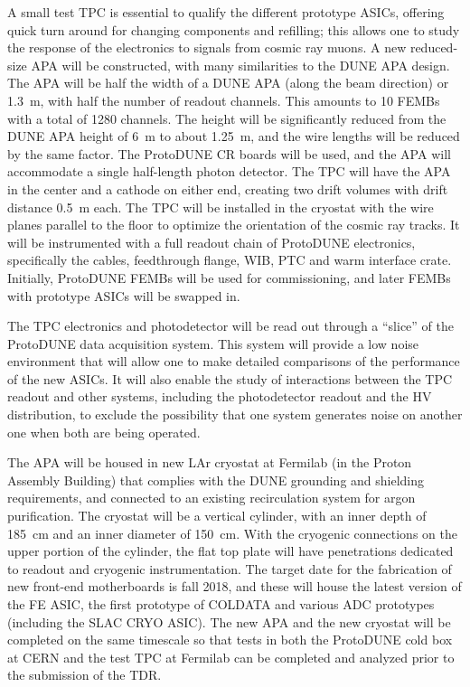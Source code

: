 A small test TPC is essential to qualify the different prototype ASICs, offering quick turn around for changing components and refilling; this allows one to study the response of the electronics to signals from cosmic ray muons.  A new reduced-size APA will be constructed, with many similarities to the DUNE APA design.  The APA will be half the width of a DUNE APA (along the beam direction) or 1.3~m, with half the number of readout channels.  This amounts to 10 FEMBs with a total of 1280 channels.  The height will be significantly reduced from the DUNE APA height of 6~m to about 1.25~m, and the wire lengths will be reduced by the same factor.  The ProtoDUNE CR boards will be used, and  the APA will accommodate a single half-length photon detector.  The TPC will have the APA in the center and a cathode on either end, creating two drift volumes with drift distance 0.5~m each.  The TPC will be installed in the cryostat with the wire planes parallel to the floor to optimize the orientation of the cosmic ray tracks.  It will be instrumented with a full readout chain of ProtoDUNE electronics, specifically  the cables, feedthrough flange, WIB, PTC and warm interface crate.  Initially, ProtoDUNE FEMBs will be used for commissioning, and later FEMBs with prototype ASICs will be swapped in.

The TPC electronics and photodetector will be read out through a ``slice'' of the ProtoDUNE data acquisition system.  This system will provide a low noise environment that will allow one to make detailed comparisons of the performance of the new ASICs. It will also enable the study of interactions between the TPC readout and other systems, including the photodetector readout and the HV distribution, to exclude the possibility that one system generates noise on another one when both are being operated.
 
The APA will be housed in new LAr cryostat at Fermilab (in the Proton Assembly Building) that complies with the DUNE grounding and shielding requirements, and connected to an existing recirculation system for argon purification.  The cryostat will be a vertical cylinder, with an inner depth of 185~cm and an inner diameter of 150~cm.  With the cryogenic connections on the upper portion of the cylinder, the flat top plate will have penetrations dedicated to readout and cryogenic instrumentation.  The target date for the fabrication of new front-end motherboards is fall 2018, and these will house the latest version of the FE ASIC, the first prototype of COLDATA and various ADC prototypes (including the SLAC CRYO ASIC).  The new APA and the new cryostat will be completed on the same timescale so that tests in both the ProtoDUNE cold box at CERN and the test TPC at Fermilab can be completed and analyzed prior to the submission of the TDR.  
